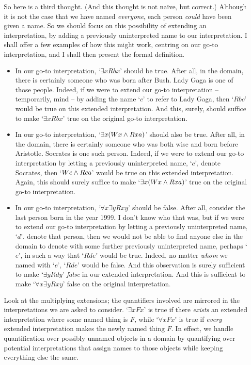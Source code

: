 \begin{earg}
So here is a third thought. (And this thought is not naïve, but correct.) Although it is not the case that we have named \emph{everyone}, each person \emph{could} have been given a name. So we should focus on this possibility of extending an interpretation, by adding a previously uninterpreted name to our interpretation. I shall offer a few examples of how this might work, centring on our go-to interpretation, and I shall then present the formal definition. 
\begin{itemize}
	\item In our go-to interpretation, `$\exists x Rbx$' should be true. After all, in the domain, there is certainly someone who was born after Bush. Lady Gaga is one of those people. Indeed, if we were to extend our go-to interpretation – temporarily, mind – by adding the name `$c$' to refer to Lady Gaga, then `$Rbc$' would be true on this extended interpretation. And this, surely, should suffice to make `$\exists x Rbx$' true on the original go-to interpretation. 
	\item In our go-to interpretation, `$\exists x (Wx \wedge Rxa)$' should also be true. After all, in the domain, there is certainly someone who was both wise and born before Aristotle. Socrates is one such person. Indeed, if we were to extend our go-to interpretation by letting a previously uninterpreted name, `$c$', denote Socrates, then `$Wc \wedge Rca$' would be true on this extended interpretation. Again, this should surely suffice to make `$\exists x (Wx \wedge Rxa)$' true on the original go-to interpretation. 
	\item In our go-to interpretation, `$\forall x \exists y Rxy$' should be false. After all, consider the last person born in the year 1999. I don't know who that was, but if we were to extend our go-to interpretation by letting a previously uninterpreted name, `$d$', denote that person, then we would not be able to find anyone else in the domain to denote with some further previously uninterpreted name, perhaps `$e$', in such a way that `$Rde$' would be true. Indeed, no matter \emph{whom} we named with `$e$', `$Rde$' would be false. And this observation is surely sufficient to make `$\exists y Rdy$' \emph{false} in our extended interpretation. And this is sufficient to make `$\forall x \exists y Rxy$' false on the original interpretation.
\end{itemize} Look at the multiplying extensions; the quantifiers involved are mirrored in the interpretations we are asked to consider. `$\exists x Fx$' is true if there \emph{exists} an extended interpretation where some named thing is $F$, while `$\forall x Fx$' is true if \emph{every} extended interpretation makes the newly named thing $F$. In effect, we handle quantification over possibly unnamed objects in a domain by quantifying over potential interpretations that assign names to those objects while keeping everything else the same.  


\end{earg}
